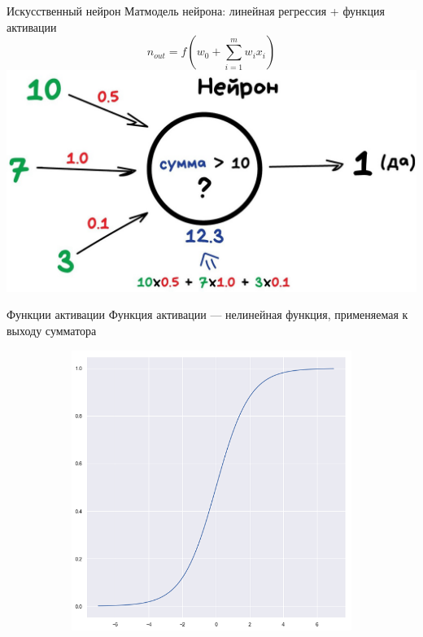 \documentclass[aspectratio=169]{beamer}
\begin{document}
\begin{frame}{Искусственный нейрон}
    \centering
    \small Матмодель нейрона: линейная регрессия + функция активации
    \[ n_{out} = f(w_0 + \sum^{m}_{i=1} w_i x_i) \]
    \includegraphics[width=.6\linewidth]{graphs/fig10.jpg}
\end{frame}

\begin{frame}{Функции активации}
    \small Функция активации --- нелинейная функция, применяемая к выходу сумматора
    \begin{figure}
        \begin{subfigure}[b]{.32\linewidth}
            \centering
            \includegraphics[width=\linewidth]{graphs/fig11.png}
        \end{subfigure}
        \begin{subfigure}[b]{.32\linewidth}

\end{subfigure}
\end{figure}
\end{frame}
\end{document}
